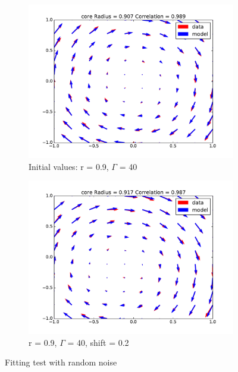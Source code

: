 \documentclass[12pt, a4paper, openany]{memoir}
\begin{document}
\begin{figure}[h!]
\begin{subfigure}[b]{0.45\textwidth}
		\includegraphics[trim=40 20 40 20 ,clip, width=\textwidth]{figure/test_09_40N.pdf}
		\caption{Initial values: r = 0.9, $\Gamma$ = 40}
	\end{subfigure}
	\begin{subfigure}[b]{0.45\textwidth}
		\centering
		\includegraphics[trim=40 20 40 20 ,clip, width=\textwidth]{figure/test_09_40_02N.pdf}
		\caption{r = 0.9, $\Gamma$ = 40, shift = 0.2}
	\end{subfigure}
	\caption{Fitting test with random noise}
	\label{fig:fittingtestsnoise}
\end{figure}
\end{document}
